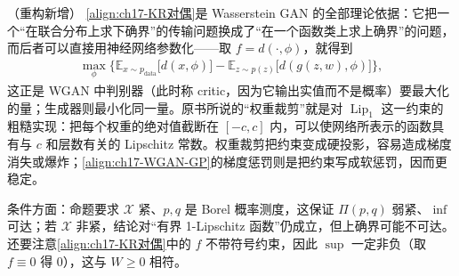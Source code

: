 \documentclass[../../main.tex]{subfiles}
\begin{document}
\begin{remark}（重构新增）
\eqref{align:ch17-KR对偶}是 Wasserstein GAN 的全部理论依据：它把一个“在联合分布上求下确界”的传输问题换成了“在一个函数类上求上确界”的问题，而后者可以直接用神经网络参数化——取 $f=d(\cdot,\phi)$，就得到
\begin{align*}
\max_{\phi}\Big\{\mathbb{E}_{x\sim p_{\mathrm{data}}}\big[d(x,\phi)\big]-\mathbb{E}_{z\sim p(z)}\big[d(g(z,w),\phi)\big]\Big\},
\end{align*}
这正是 WGAN 中判别器（此时称 critic，因为它输出实值而不是概率）要最大化的量；生成器则最小化同一量。原书所说的“权重裁剪”就是对 $\operatorname{Lip}_1$ 这一约束的粗糙实现：把每个权重的绝对值截断在 $[-c,c]$ 内，可以使网络所表示的函数具有与 $c$ 和层数有关的 Lipschitz 常数。权重裁剪把约束变成硬投影，容易造成梯度消失或爆炸；\eqref{align:ch17-WGAN-GP}的梯度惩罚则是把约束写成软惩罚，因而更稳定。

条件方面：命题要求 $\mathcal{X}$ 紧、$p,q$ 是 Borel 概率测度，这保证 $\Pi(p,q)$ 弱紧、$\inf$ 可达；若 $\mathcal{X}$ 非紧，结论对“有界 1-Lipschitz 函数”仍成立，但上确界可能不可达。还要注意\eqref{align:ch17-KR对偶}中的 $f$ 不带符号约束，因此 $\sup$ 一定非负（取 $f\equiv0$ 得 $0$），这与 $W\geqslant0$ 相符。
\end{remark}
\end{document}
